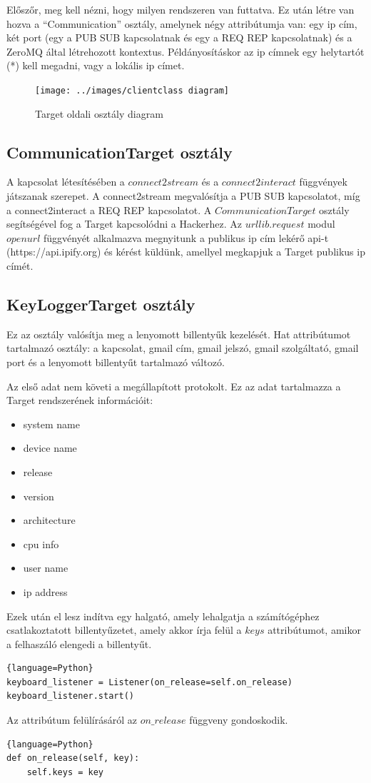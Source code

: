 \documentclass[12pt,a4paper,oneside]{report}
\begin{document}
Előszőr, meg kell nézni, hogy milyen rendszeren van futtatva. Ez után létre van hozva a ``Communication'' osztály, amelynek négy attribútumja van: egy ip cím, két port (egy a PUB SUB kapcsolatnak és egy a REQ REP kapcsolatnak) és a ZeroMQ által létrehozott kontextus. Példányosításkor az ip címnek egy helytartót (*) kell megadni, vagy a lokális ip címet.
\begin{figure}[H]
\centering
\texttt{[image: ../images/clientclass diagram]}
\caption{Target oldali osztály diagram}
\label{fig:clientclassdia}
\end{figure}

\subsection{CommunicationTarget osztály}\label{subsubsec:clinetclass}
A kapcsolat létesítésében a $connect2stream$ és a $connect2interact$ függvények játszanak szerepet. A connect2stream megvalósítja a PUB SUB kapcsolatot, míg a connect2interact a REQ REP kapcsolatot. A $CommunicationTarget$ osztály segítségével fog a Target kapcsolódni a Hackerhez. Az $urllib.request$ modul $openurl$ függvényét alkalmazva megnyitunk a publikus ip cím lekérő api-t (https://api.ipify.org) és kérést küldünk, amellyel megkapjuk a Target publikus ip címét.

\subsection{KeyLoggerTarget osztály}\label{subsubsec:keyloggerclientclass}
Ez az osztály valósítja meg a lenyomott billentyűk kezelését. Hat attribútumot tartalmazó osztály: a kapcsolat, gmail cím, gmail jelszó, gmail szolgáltató, gmail port és a lenyomott billentyűt tartalmazó változó.

Az első adat nem követi a megállapított protokolt. Ez az adat tartalmazza a Target rendszerének információit:
\begin{itemize}
\item system name
\item device name
\item release
\item version
\item architecture
\item cpu info
\item user name
\item ip address
\end{itemize}
Ezek után el lesz indítva egy halgató, amely lehalgatja a számítógéphez csatlakoztatott billentyűzetet, amely akkor írja felül a $keys$ attribútumot, amikor a felhaszáló elengedi a billentyűt.
\begin{lstlisting}{language=Python}
keyboard_listener = Listener(on_release=self.on_release)
keyboard_listener.start()
\end{lstlisting}
Az attribútum felülírásáról az $on\_release$ függveny gondoskodik.
\begin{lstlisting}{language=Python}
def on_release(self, key):
	self.keys = key
\end{lstlisting}
\end{document}
